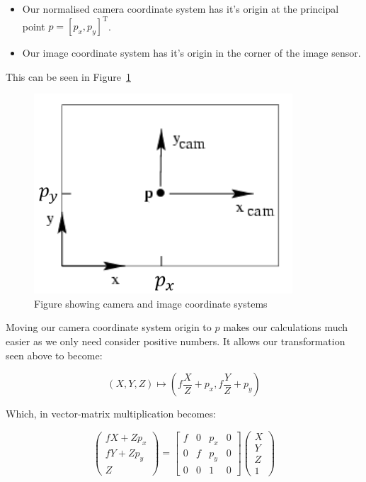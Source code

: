 \documentclass{article}
\begin{document}
\begin{itemize}
  \item Our normalised camera coordinate system has it's origin at the principal point $p = [p_{x},p_{y}]^{\text{T}}$.
  \item Our image coordinate system has it's origin in the corner of the image sensor.
\end{itemize}

This can be seen in Figure~\ref{fig:1}

\begin{figure}[ht]
  \centering
  \includegraphics[scale=0.7]{figures/l2-1.png}
  \caption{\label{fig:1} Figure showing camera and image coordinate systems}
\end{figure}

Moving our camera coordinate system origin to $p$ makes our calculations much easier as we only need consider positive numbers. It allows our transformation seen above to become:

\[
  (X,Y,Z)\mapsto (f \frac{X}{Z}+p_{x}, f \frac{Y}{Z}+p_{y})
\]

Which, in vector-matrix multiplication becomes:

\[
  \begin{pmatrix}
    f X + Z p_{x} \\
    f Y + Z p_{y} \\
    Z
  \end{pmatrix} =
  \begin{bmatrix}
    f & 0 & p_{x} & 0\\
    0 & f & p_{y} & 0\\
    0 & 0 & 1 & 0
  \end{bmatrix}
  \begin{pmatrix}
    X \\ Y \\ Z \\ 1
  \end{pmatrix}
\]
\end{document}
